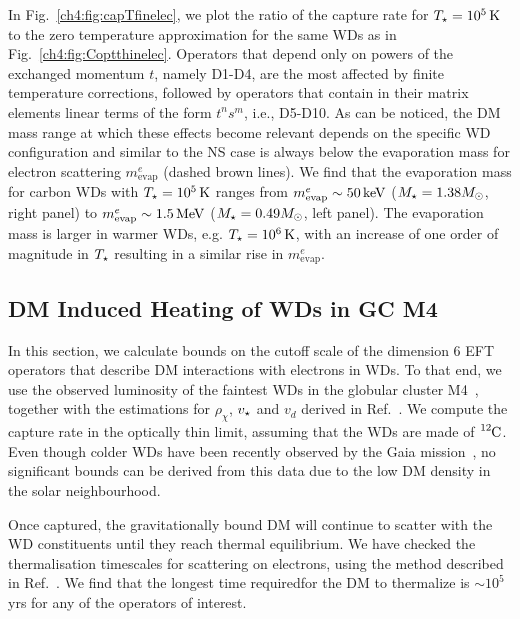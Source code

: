 In Fig.~\ref{ch4:fig:capTfinelec}, we plot the ratio of the capture rate for $T_\star=10^5{\rm \,K}$ to the zero temperature approximation for the same WDs as in Fig.~\ref{ch4:fig:Coptthinelec}. Operators that depend only on powers of the exchanged momentum $t$, namely D1-D4, are the most affected by finite temperature corrections, followed by operators that contain in their matrix elements linear terms of the form $t^n s^m$, i.e., D5-D10. As can be noticed, the DM mass range at which these effects become relevant depends on the specific WD configuration and similar to the NS case is always below the evaporation mass for electron scattering $m_\mathrm{evap}^e$ (dashed brown lines).  We find that the evaporation mass for carbon WDs with  $T_\star=10^5{\rm \,K}$ ranges from $m_\mathrm{evap}^e\sim 50{\rm \,keV}$ ($M_\star=1.38M_\odot$, right panel) to $m_\mathrm{evap}^e\sim 1.5{\rm \,MeV}$ ($M_\star=0.49M_\odot$, left panel). 
The evaporation mass is larger in warmer WDs, e.g. $T_\star=10^6{\rm \,K}$, with an increase of one order of magnitude in $T_\star$ resulting in a similar rise in $m_\mathrm{evap}^e$.  

\subsection{DM Induced Heating of WDs in GC M4}
\label{ch4:subsec:WD_results}




In this section, we calculate bounds on the cutoff scale of the dimension 6 EFT operators that describe DM interactions with electrons in WDs. To that end, we use the observed luminosity of the faintest WDs in the globular cluster M4~\cite{Bedin:2009it_jun_Endwhitedwarf,McCullough:2010ai_CaptureInelasticDark}, together with the estimations for $\rho_\chi$, $v_\star$ and $v_d$ derived in Ref.~\cite{McCullough:2010ai_CaptureInelasticDark}.  We compute the capture rate in the optically thin limit, assuming that the WDs are made of $\ce{^{12}C}$. Even though colder WDs have been recently observed by the Gaia mission~\cite{GentileFusillo_feb_GaiaDataRelease}, no significant bounds can be derived from this data due to the low DM density in the solar neighbourhood. 


Once captured, the gravitationally bound DM will continue to scatter with the WD constituents until they reach thermal equilibrium. We have checked the thermalisation timescales for scattering on electrons, using the method described in Ref.~\cite{Bertoni:2013bsa_dec_DarkMatterThermalization}. We find that the longest time requiredfor the DM to thermalize is $\sim 10^{5}$ yrs for any of the operators of interest.

